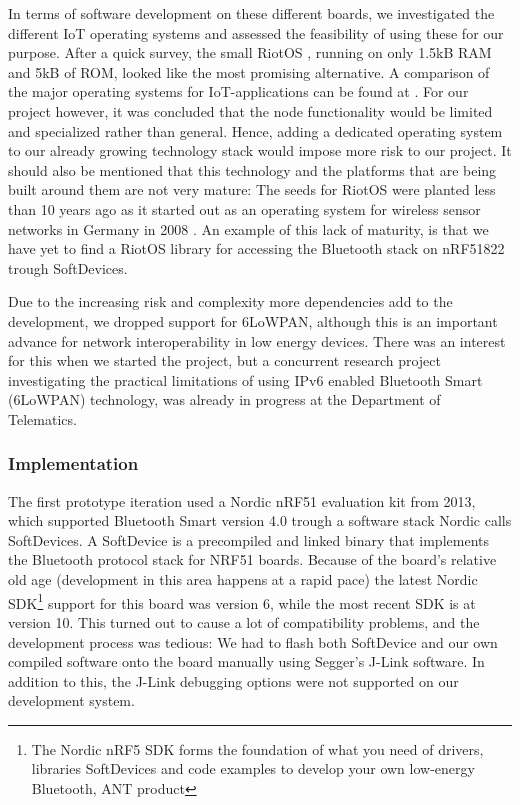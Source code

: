 In terms of software development on these different boards, we investigated the different IoT operating systems and assessed the feasibility of using these for our purpose. After a quick survey, the small RiotOS \cite{Anonymous:a1din1ZK}, running on only 1.5kB RAM and 5kB of ROM, looked like the most promising alternative. A comparison of the major operating systems for IoT-applications can be found at \cite{Anonymous:a1din1ZK}. For our project however, it was concluded that the node functionality would be limited and specialized rather than general. Hence, adding a dedicated operating system to our already growing technology stack would impose more risk to our project. It should also be mentioned that this technology and the platforms that are being built around them are not very mature: The seeds for RiotOS were planted less than 10 years ago as it started out as an operating system for wireless sensor networks in Germany in 2008 \cite{newRef:52}. An example of this lack of maturity, is that we have yet to find a RiotOS library for accessing the Bluetooth stack on nRF51822 trough SoftDevices.

Due to the increasing risk and complexity more dependencies add to the development, we dropped support for 6LoWPAN, although this is an important advance for network interoperability in low energy devices. There was an interest for this when we started the project, but a concurrent research project investigating the practical limitations of using IPv6 enabled Bluetooth Smart (6LoWPAN) technology, was already in progress at the Department of Telematics.


\subsubsection{Implementation} %
\label{ssub:implementation}

The first prototype iteration used a Nordic nRF51 evaluation kit from 2013, which supported Bluetooth Smart version 4.0 trough a software stack Nordic calls SoftDevices. A SoftDevice is a precompiled and linked binary that implements the Bluetooth protocol stack for NRF51 boards. Because of the board's relative old age (development in this area happens at a rapid pace) the latest Nordic SDK\footnote{ The Nordic nRF5 SDK forms the foundation of what you need of drivers, libraries SoftDevices and code examples to develop your own low-energy Bluetooth, ANT product} support for this board was version 6, while the most recent SDK is at version 10. This turned out to cause a lot of compatibility problems, and the development process was tedious: We had to flash both SoftDevice and our own compiled software onto the board manually using Segger's J-Link software. In addition to this, the J-Link debugging options were not supported on our development system.

